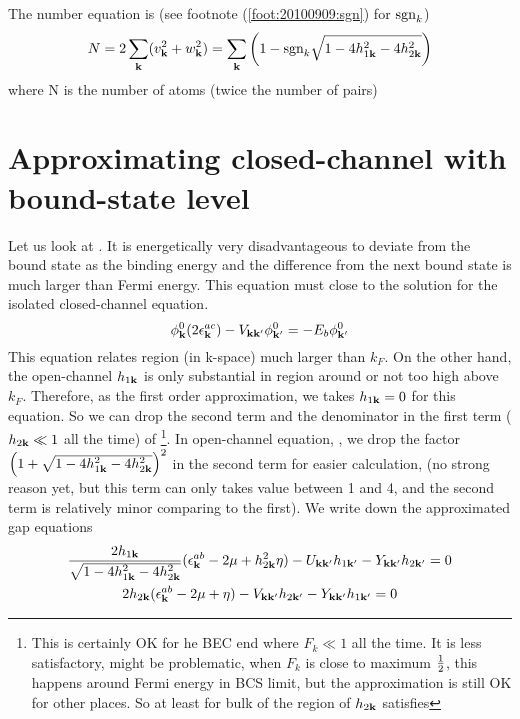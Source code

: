 The number equation is (see footnote (\ref{foot:20100909:sgn}) for $\text{sgn}_{k}$)
\begin{equation}\label{eq:20100909:number}
N=2\sum_{\mathbf{k}}(v_{\mathbf{k}}^{2}+w_{\mathbf{k}}^{2})=\sum_{\mathbf{k}}\left(1-\text{sgn}_{k}\sqrt{1-4 h_{1\mathbf{k}}^2-4 h_{2\mathbf{k}}^2}\right)
\end{equation} 
where N is the number of atoms (twice  the number of pairs)

\section{Approximating closed-channel with bound-state level}
Let us look at .  It is energetically very disadvantageous to deviate from the bound state as the binding energy and the difference from the next bound state is much  larger than Fermi energy.     This equation must close to  the solution for the isolated closed-channel \sch equation.  
\begin{equation}\label{eq:20100915:twobody}
{\phi^{0}_{\ensuremath{\mathbf{k}}}}(2\epsilon^{ac}_{\mathbf{k}})-V_{\mathbf{k}\mathbf{k}'}\phi^{0}_{\mathbf{k}'}=-E_{b}\phi^{0}_{\mathbf{k}'}
\end{equation}
This equation relates region (in k-space) much larger than $k_{F}$.  On the other hand, the open-channel 
$h_{1\mathbf{k}}$ is only substantial in region around or not too high above  $k_{F}$.  Therefore, as the first order approximation, we takes $h_{1\mathbf{k}}=0$ for this equation. So we can drop the second term and the denominator in the first term ($h_{2\mathbf{k}}\ll1$ all the time) of \footnote{ This is certainly OK for he BEC end where $F_{k}\ll1$ all the time.  It is less satisfactory, might be problematic,  when $F_{k}$ is close to maximum $\frac{1}{2}$, this happens around Fermi energy in BCS limit, but the approximation is still OK for other places. So at least for bulk of the region of $h_{2\mathbf{k}}$ satisfies }.  In  open-channel equation, , we drop the factor $\left(1+\sqrt{1-4 h_{1\mathbf{k}}^2-4 h_{2\mathbf{k}}^2}\right)^2$ in the second term for easier calculation, (no strong reason yet, but this term can only takes value between 1 and 4, and the second term is relatively minor comparing to the first). We write down the approximated gap equations
\begin{subequations}\label{eq:20100915:gap}
\begin{gather}\label{eq:20100915:gapa}
\frac{2h_{1\mathbf{k}}}{\sqrt{1-4 h_{1\mathbf{k}}^2-4 h_{2\mathbf{k}}^2}} (\epsilon^{ab}_{\mathbf{k}}-2\mu+  h_{2\mathbf{k}}^2\eta)-U_{\mathbf{k}\mathbf{k}'}h_{1\mathbf{k}'}-Y_{\mathbf{k}\mathbf{k}'}h_{2\mathbf{k}'}=0\\
\label{eq:20100915:gapb}
{2h_{2\ensuremath{\mathbf{k}}}}(\epsilon^{ab}_{\mathbf{k}}-2\mu+\eta)-V_{\mathbf{k}\mathbf{k}'}h_{2\mathbf{k}'}-Y_{\mathbf{k}\mathbf{k}'}h_{1\mathbf{k}'}=0
\end{gather}
\end{subequations}
